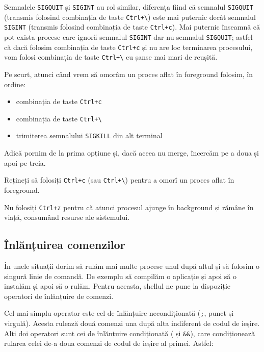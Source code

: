 Semnalele \texttt{SIGQUIT} și \texttt{SIGINT} au rol similar, diferența fiind că semnalul \texttt{SIGQUIT} (transmis folosind combinația de taste \texttt{Ctrl+\textbackslash{}}) este mai puternic decât semnalul \texttt{SIGINT} (transmis folosind combinația de taste \texttt{Ctrl+c}).
Mai puternic înseamnă că pot exista procese care ignoră semnalul \texttt{SIGINT} dar nu semnalul \texttt{SIGQUIT};
astfel că dacă folosim combinația de taste \texttt{Ctrl+c} și nu are loc terminarea procesului, vom folosi combinația de taste \texttt{Ctrl+\textbackslash{}} cu șanse mai mari de reușită.

Pe scurt, atunci când vrem să omorâm un proces aflat în foreground folosim, în ordine:

\begin{itemize}
  \item combinația de taste \texttt{Ctrl+c}
  \item combinația de taste \texttt{Ctrl+\textbackslash{}}
  \item trimiterea semnalului \texttt{SIGKILL} din alt terminal
\end{itemize}

Adică pornim de la prima opțiune și, dacă aceea nu merge, încercăm pe a doua și apoi pe treia.

\begin{note}
  Rețineți să folosiți \texttt{Ctrl+c} (sau \texttt{Ctrl+\textbackslash{}}) pentru a omorî un proces aflat în foreground.

  Nu folosiți \texttt{Ctrl+z} pentru că atunci procesul ajunge în background și rămâne în viață, consumând resurse ale sistemului.
\end{note}

\subsection{Înlănțuirea comenzilor}
\label{sec:process:command-chaining}

În unele situații dorim să rulăm mai multe procese unul după altul și să folosim o singură linie de comandă.
De exemplu să compilăm o aplicație și apoi să o instalăm și apoi să o rulăm.
Pentru aceasta, shellul ne pune la dispoziție operatori de înlănțuire de comenzi.

Cel mai simplu operator este cel de înlănțuire necondiționată (\texttt{;}, punct și virgulă).
Acesta rulează două comenzi una după alta indiferent de codul de ieșire.
Alți doi operatori sunt cei de înlănțuire condiționată (\texttt{\textbar{}\textbar{}} și \texttt{\&\&}), care condiționează rularea celei de-a doua comenzi de codul de ieșire al primei.
Astfel:

